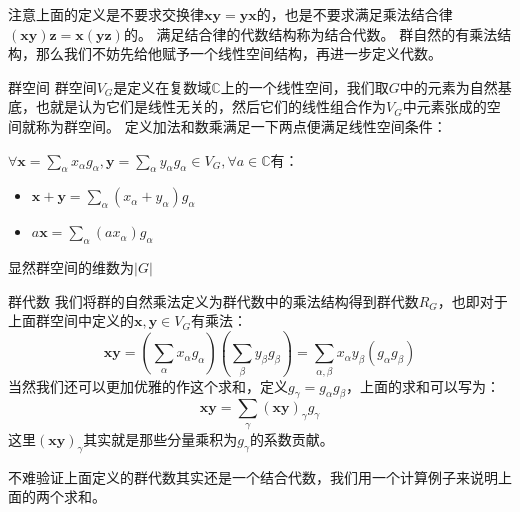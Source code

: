 注意上面的定义是不要求交换律$\mathbf{x}\mathbf{y}=\mathbf{y}\mathbf{x}$的，也是不要求满足乘法结合律$(\mathbf{x}\mathbf{y})\mathbf{z}=\mathbf{x}(\mathbf{y}\mathbf{z})$的。 满足结合律的代数结构称为结合代数。
群自然的有乘法结构，那么我们不妨先给他赋予一个线性空间结构，再进一步定义代数。
\begin{define}{群空间}
    群空间$V_G$是定义在复数域$\mathbb{C}$上的一个线性空间，我们取$G$中的元素为自然基底，也就是认为它们是线性无关的，然后它们的线性组合作为$V_G$中元素张成的空间就称为群空间。
    定义加法和数乘满足一下两点便满足线性空间条件：

    $\forall\mathbf{x}=\sum\limits_\alpha x_\alpha g_\alpha,\mathbf{y}=\sum\limits_\alpha y_\alpha g_\alpha\in V_G,\forall a\in \mathbb{C}$有：
    \begin{itemize}
        \item $\mathbf{x}+\mathbf{y}=\sum\limits_\alpha(x_\alpha +y_\alpha)g_\alpha$
        \item $a\mathbf{x}=\sum\limits_\alpha (ax_\alpha) g_\alpha$
    \end{itemize}

    显然群空间的维数为$|G|$
\end{define}
\begin{define}{群代数}
    我们将群的自然乘法定义为群代数中的乘法结构得到群代数$R_G$，也即对于上面群空间中定义的$\mathbf{x},\mathbf{y}\in V_G$有乘法：
    \[\mathbf{x}\mathbf{y}=\left(\sum\limits_\alpha x_\alpha g_\alpha\right)\left(\sum\limits_\beta y_\beta g_\beta\right)=\sum\limits_{\alpha,\beta}x_\alpha y_\beta (g_\alpha g_\beta)\]
    当然我们还可以更加优雅的作这个求和，定义$g_\gamma=g_\alpha g_\beta$，上面的求和可以写为：
    \[\mathbf{x}\mathbf{y}=\sum\limits_{\gamma}(\mathbf{x}\mathbf{y})_\gamma g_\gamma\]
    这里$(\mathbf{x}\mathbf{y})_\gamma$其实就是那些分量乘积为$g_\gamma$的系数贡献。
\end{define}

不难验证上面定义的群代数其实还是一个结合代数，我们用一个计算例子来说明上面的两个求和。

